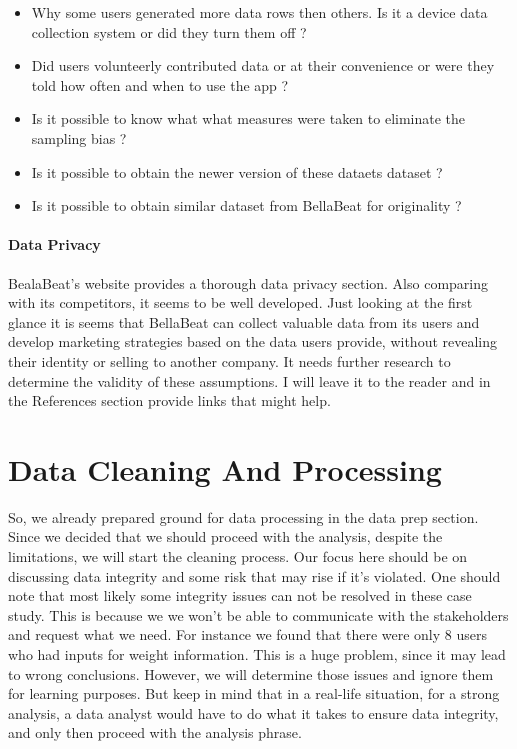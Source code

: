 \documentclass[
]{article}
\providecommand{\tightlist}{%
  \setlength{\itemsep}{0pt}\setlength{\parskip}{0pt}}
\begin{document}
\begin{itemize}
\tightlist
\item
  Why some users generated more data rows then others. Is it a device
  data collection system or did they turn them off ?
\item
  Did users volunteerly contributed data or at their convenience or were
  they told how often and when to use the app ?
\item
  Is it possible to know what what measures were taken to eliminate the
  sampling bias ?
\item
  Is it possible to obtain the newer version of these dataets dataset ?
\item
  Is it possible to obtain similar dataset from BellaBeat for
  originality ?
\end{itemize}

\hypertarget{data-privacy}{%
\paragraph{Data Privacy}\label{data-privacy}}

BealaBeat's website provides a thorough data privacy section. Also
comparing with its competitors, it seems to be well developed. Just
looking at the first glance it is seems that BellaBeat can collect
valuable data from its users and develop marketing strategies based on
the data users provide, without revealing their identity or selling to
another company. It needs further research to determine the validity of
these assumptions. I will leave it to the reader and in the References
section provide links that might help.

\hypertarget{data-cleaning-and-processing}{%
\section{Data Cleaning And
Processing}\label{data-cleaning-and-processing}}

So, we already prepared ground for data processing in the data prep
section. Since we decided that we should proceed with the analysis,
despite the limitations, we will start the cleaning process. Our focus
here should be on discussing data integrity and some risk that may rise
if it's violated. One should note that most likely some integrity issues
can not be resolved in these case study. This is because we we won't be
able to communicate with the stakeholders and request what we need. For
instance we found that there were only 8 users who had inputs for weight
information. This is a huge problem, since it may lead to wrong
conclusions. However, we will determine those issues and ignore them for
learning purposes. But keep in mind that in a real-life situation, for a
strong analysis, a data analyst would have to do what it takes to ensure
data integrity, and only then proceed with the analysis phrase.
\end{document}
